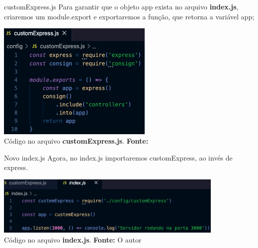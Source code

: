 \documentclass{beamer}
\begin{document}
    \begin{frame}{customExpress.js}
 	Para garantir que o objeto \alert{app} exista no arquivo \textbf{index.js}, criaremos um \alert{module.export} e exportaremos a função, que retorna a variável app; 
        
         \begin{center}
    	\includegraphics[width=75mm]{resources/aula4_10.png}\\
        \tiny{ Código no arquivo \textbf{customExpress.js}. \textbf{Fonte:} \cite{nodejs2022api}}
     \end{center}   
    \end{frame}
    \begin{frame}{Novo index.js}
 	Agora, no index.js importaremos customExpress, ao invés de express.
        
         \begin{center}
    	\includegraphics[width=110mm]{resources/aula4_11.png}\\
        \tiny{ Código no arquivo \textbf{index.js}. \textbf{Fonte:} O autor}
     \end{center}   
    \end{frame}    
\end{document}
